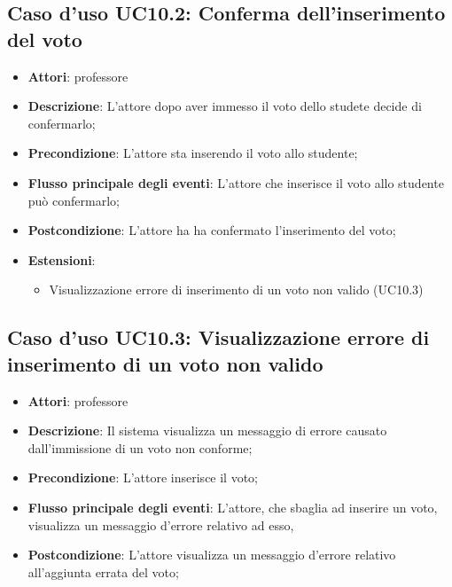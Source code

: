 \subsection{Caso d'uso \texorpdfstring{UC10.2}{UC10.2}: Conferma dell'inserimento del voto}
\begin{itemize}
\item \textbf{Attori}: professore
\item \textbf{Descrizione}: L'attore dopo aver immesso il voto dello studete decide di confermarlo;
\item \textbf{Precondizione}: L'attore sta inserendo il voto allo studente;
\item \textbf{Flusso principale degli eventi}: L'attore che inserisce il voto allo studente può confermarlo;
\item \textbf{Postcondizione}: L'attore ha ha confermato l'inserimento del voto;
\item \textbf{Estensioni}:
\begin{itemize}
\item Visualizzazione errore di inserimento di un voto non valido (UC10.3)
\end{itemize}
\end{itemize}
\subsection{Caso d'uso \texorpdfstring{UC10.3}{UC10.3}: Visualizzazione errore di inserimento di un voto non valido}
\begin{itemize}
\item \textbf{Attori}: professore
\item \textbf{Descrizione}: Il sistema visualizza un messaggio di errore causato dall'immissione di un voto non conforme;
\item \textbf{Precondizione}: L'attore inserisce il voto;
\item \textbf{Flusso principale degli eventi}: L'attore, che sbaglia ad inserire un voto, visualizza un messaggio d'errore relativo ad esso,
\item \textbf{Postcondizione}: L'attore visualizza un messaggio d'errore relativo all'aggiunta errata del voto;
\end{itemize}
